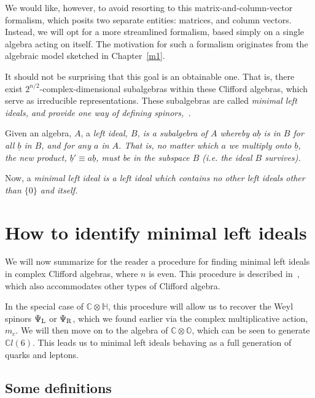 \documentclass[letterpaper,12pt,titlepage,oneside,final]{book}
\newcommand{\CH}{\mathbb{C}\otimes\mathbb{H}}
\newcommand{\CO}{\mathbb{C}\otimes\mathbb{O}}
\newcommand{\CLsix}{\mathbb{C}l(6)}
\begin{document}

We would like, however, to avoid resorting to this matrix-and-column-vector formalism, which posits two separate entities:  matrices, and column vectors.   Instead, we will opt for a more streamlined formalism, based simply on a single algebra acting on itself.  The motivation for such a formalism originates from the algebraic model sketched in Chapter~\ref{m1}.

It should not be surprising that this goal is an obtainable one.  That is, there exist $2^{n/2}$-complex-dimensional subalgebras within these Clifford algebras, which serve as irreducible representations.  These subalgebras are called \it minimal left ideals, \rm and provide one way of defining spinors,~\cite{ablam}.

Given an algebra, $A$, a \it left ideal, \rm $B$, is a subalgebra of $A$ whereby $a \underline{b}$ is in $B$ for all $\underline{b}$ in $B$, and for any $a$ in $A$.  That is, no matter which $a$ we multiply onto $\underline{b}$, the new product, $\underline{b}'\equiv a\underline{b}$, must be in the subspace $B$ (i.e.  the ideal $B$ survives).  

Now, a \it minimal left ideal \rm is a left ideal which contains no other left ideals other than $\{0\}$ and itself.


\section{How to identify minimal left ideals  }

We will now summarize for the reader a procedure for finding minimal left ideals in complex Clifford algebras, where $n$ is even.  This procedure is described in~\cite{ablam}, which also accommodates other types of Clifford algebra.  

In the special case of $\CH$,  this procedure will allow us to recover the Weyl spinors $\Psi_{\textup{L}}$ or $\Psi_{\textup{R}}$, which we found earlier via the complex multiplicative action, $m_c$.    We will then move on to the algebra of $\CO$, which can be seen to generate $\CLsix$.  This leads us to minimal left ideals behaving as a full generation of quarks and leptons.

\subsection{Some definitions  \label{defns}}
\end{document}
